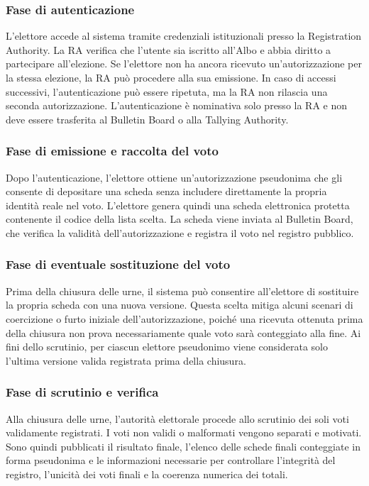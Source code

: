 \documentclass[12pt,a4paper]{article}
\begin{document}
\subsubsection*{Fase di autenticazione}

 L’elettore accede al sistema tramite credenziali istituzionali presso la Registration Authority. La RA verifica che l’utente sia iscritto all’Albo e abbia diritto a partecipare all’elezione. Se l’elettore non ha ancora ricevuto un’autorizzazione per la stessa elezione, la RA può procedere alla sua emissione. In caso di accessi successivi, l’autenticazione può essere ripetuta, ma la RA non rilascia una seconda autorizzazione. L’autenticazione è nominativa solo presso la RA e non deve essere trasferita al Bulletin Board o alla Tallying Authority. 

\subsubsection*{Fase di emissione e raccolta del voto}

Dopo l'autenticazione, l'elettore ottiene un'autorizzazione pseudonima che gli consente di depositare una scheda senza includere direttamente la propria identit\`a reale nel voto. L'elettore genera quindi una scheda elettronica protetta contenente il codice della lista scelta. La scheda viene inviata al Bulletin Board, che verifica la validit\`a dell'autorizzazione e registra il voto nel registro pubblico.

\subsubsection*{Fase di eventuale sostituzione del voto}

Prima della chiusura delle urne, il sistema pu\`o consentire all'elettore di sostituire la propria scheda con una nuova versione. Questa scelta mitiga alcuni scenari di coercizione o furto iniziale dell'autorizzazione, poich\'e una ricevuta ottenuta prima della chiusura non prova necessariamente quale voto sar\`a conteggiato alla fine. Ai fini dello scrutinio, per ciascun elettore pseudonimo viene considerata solo l'ultima versione valida registrata prima della chiusura.

\subsubsection*{Fase di scrutinio e verifica}

Alla chiusura delle urne, l'autorit\`a elettorale procede allo scrutinio dei soli voti validamente registrati. I voti non validi o malformati vengono separati e motivati. Sono quindi pubblicati il risultato finale, l'elenco delle schede finali conteggiate in forma pseudonima e le informazioni necessarie per controllare l'integrit\`a del registro, l'unicit\`a dei voti finali e la coerenza numerica dei totali.
\end{document}
